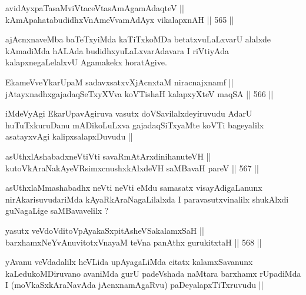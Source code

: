 \begin{shl}
avidAyxpaTasaMviVtaceVtasAmAgamAdaqteV || \\
kAmApahatabudidhxVnAmeVvamAdAyx vikalapxnAH ||  565 ||  
\end{shl}

\begin{artha}
ajAcnxnaveMba baTeTxyiMda kaTiTxkoMDa betatxvuLaLxvarU alalxde
kAmadiMda hALAda budidhxyuLaLxvarAdavara I riVtiyAda
kalapxnegaLelalxvU Agamakekx horatAgive.
\end{artha}

\begin{shl}
EkameVveYkarUpaM sadavxsatxvXjAcnxtaM niracnajxnamf || \\
jAtayxnadhxgajadaqSeTxyXVva koVTishaH kalapxyXteV maqSA ||  566 ||  
\end{shl}

\begin{artha}
iMdeVyAgi EkarUpavAgiruva vasutx doVSavilalxdeyiruvudu AdarU
huTuTxkuruDanu mADikoLuLxva gajadaqSiTxyaMte koVTi bageyalilx
asatayxvAgi kalipxsalapxDuvudu ||
\end{artha}


\begin{shl}
asUthxlAshabadxneVtiVti savaRmAtArxdinihanuteVH || \\
kutoV\s kAraNakAyeVR\s simxcnushxkAlxdeVH saMBavaH pareV ||  567 ||  
\end{shl}

\begin{artha}
asUthxlaMmashabadhx neVti neVti eMdu samasatx visayAdigaLanunx
nirAkarisuvudariMda kAyaRkAraNagaLilalxda I paravasutxvinalilx
shukAlxdi guNagaLige saMBavavelilx ?
\end{artha}


\begin{shl}
yasutx veVdoVditoVpAyakaSxpitAsheVSakalamxSaH || \\
barxhamxNeYvAnuvitotxVnayaM teVna panAthx gurukitxtaH ||  568 ||  
\end{shl}

\begin{artha}
yAvanu veVdadalilx heVLida upAyagaLiMda citatx kalamxSavanunx
kaLedukoMDiruvano avaniMda gurU padeVshada naMtara barxhamx rUpadiMda
I (moVkaSxkAraNavAda jAcnxnamAgaRvu) paDeyalapxTiTxruvudu ||
\end{artha}

